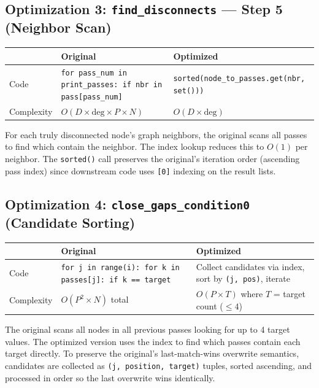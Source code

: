 \documentclass[11pt,a4paper]{article}
\begin{document}
\subsection{Optimization 3: \texttt{find\_disconnects} --- Step 5 (Neighbor Scan)}

\begin{table}[H]
\centering
\begin{tabularx}{\textwidth}{lXX}
\toprule
& \textbf{Original} & \textbf{Optimized} \\
\midrule
Code & \texttt{for pass\_num in print\_passes: if nbr in pass[pass\_num]} & \texttt{sorted(node\_to\_passes.get(nbr, set()))} \\
Complexity & $O(D \times \text{deg} \times P \times N)$ & $O(D \times \text{deg})$ \\
\bottomrule
\end{tabularx}
\end{table}

For each truly disconnected node's graph neighbors, the original scans all passes to find which contain the neighbor. The index lookup reduces this to $O(1)$ per neighbor. The \texttt{sorted()} call preserves the original's iteration order (ascending pass index) since downstream code uses \texttt{[0]} indexing on the result lists.

\subsection{Optimization 4: \texttt{close\_gaps\_condition0} (Candidate Sorting)}

\begin{table}[H]
\centering
\begin{tabularx}{\textwidth}{lXX}
\toprule
& \textbf{Original} & \textbf{Optimized} \\
\midrule
Code & \texttt{for j in range(i): for k in passes[j]: if k == target} & Collect candidates via index, sort by \texttt{(j, pos)}, iterate \\
Complexity & $O(P^2 \times N)$ total & $O(P \times T)$ where $T$ = target count ($\leq 4$) \\
\bottomrule
\end{tabularx}
\end{table}

The original scans all nodes in all previous passes looking for up to 4 target values. The optimized version uses the index to find which passes contain each target directly. To preserve the original's last-match-wins overwrite semantics, candidates are collected as \texttt{(j, position, target)} tuples, sorted ascending, and processed in order so the last overwrite wins identically.
\end{document}
